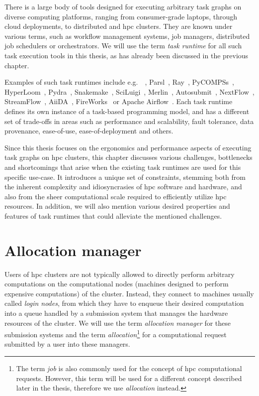 There is a large body of tools designed for executing arbitrary task graphs on diverse computing
platforms, ranging from consumer-grade laptops, through cloud deployments, to distributed and
\gls{hpc} clusters. They are known under various terms, such as workflow
management systems, job managers, distributed job schedulers or orchestrators. We will use the term
\emph{task runtime} for all such task execution tools in this thesis, as has already been
discussed in the previous chapter.

Examples of such task runtimes include e.g.\ \dask{}~\cite{dask},
Parsl~\cite{parsl}, Ray~\cite{ray},
PyCOMPSs~\cite{pycompss}, HyperLoom~\cite{hyperloom},
Pydra~\cite{pydra}, Snakemake~\cite{snakemake},
SciLuigi~\cite{sciluigi}, Merlin~\cite{merlin},
Autosubmit~\cite{autosubmit}, NextFlow~\cite{nextflow},
StreamFlow~\cite{streamflow}, AiiDA~\cite{aiida},
FireWorks~\cite{fireworks} or Apache Airflow~\cite{airfow}. Each task
runtime defines its own instance of a task-based programming model, and has a different set of
trade-offs in areas such as performance and scalability, fault tolerance, data provenance,
ease-of-use, ease-of-deployment and others.

Since this thesis focuses on the ergonomics and performance aspects of executing task graphs on
\gls{hpc} clusters, this chapter discusses various challenges, bottlenecks and
shortcomings that arise when the existing task runtimes are used for this specific use-case. It
introduces a unique set of constraints, stemming both from the inherent complexity and
idiosyncrasies of \gls{hpc} software and hardware, and also from the sheer
computational scale required to efficiently utilize \gls{hpc} resources. In
addition, we will also mention various desired properties and features of task runtimes that could
alleviate the mentioned challenges.

\section{Allocation manager}
\label{sec:allocation-manager}
Users of \gls{hpc} clusters are not typically allowed to directly perform
arbitrary computations on the computational nodes (machines designed to perform expensive
computations) of the cluster. Instead, they connect to machines usually called
\emph{login nodes}, from which they have to enqueue their desired computation into a queue
handled by a submission system that manages the hardware resources of the cluster. We will use the
term \emph{allocation manager} for these submission systems and the term
\emph{allocation}\footnote{The term \emph{job} is also commonly used for the concept of
\gls{hpc} computational requests. However, this term will be used for a different concept described later in the thesis, therefore we use \emph{allocation} instead.} for a computational request submitted by a
user into these managers.

